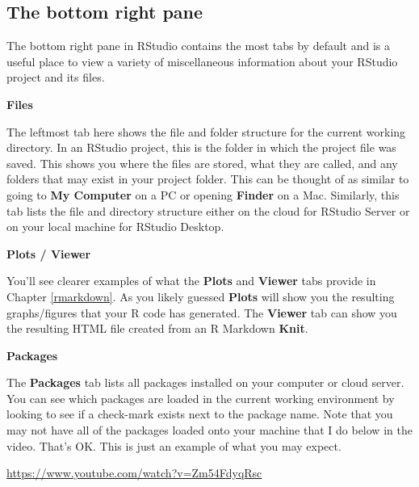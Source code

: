 \documentclass[]{tufte-book}
\begin{document}
\subsection{The bottom right pane}\label{the-bottom-right-pane}

The bottom right pane in RStudio contains the most tabs by default and is a useful place to view a variety of miscellaneous information about your RStudio project and its files.

\vspace*{0.2in}

\noindent\textbf{Files}\vspace*{0.1in}

The leftmost tab here shows the file and folder structure for the current working directory. In an RStudio project, this is the folder in which the project file was saved. This shows you where the files are stored, what they are called, and any folders that may exist in your project folder. This can be thought of as similar to going to \textbf{My Computer} on a PC or opening \textbf{Finder} on a Mac. Similarly, this tab lists the file and directory structure either on the cloud for RStudio Server or on your local machine for RStudio Desktop.

\vspace*{0.2in}

\noindent\textbf{Plots / Viewer}\vspace*{0.1in}

You'll see clearer examples of what the \textbf{Plots} and \textbf{Viewer} tabs provide in Chapter \ref{rmarkdown}. As you likely guessed \textbf{Plots} will show you the resulting graphs/figures that your R code has generated. The \textbf{Viewer} tab can show you the resulting HTML file created from an R Markdown \textbf{Knit}.

\vspace*{0.2in}

\noindent\textbf{Packages}\vspace*{0.1in}

The \textbf{Packages} tab lists all packages installed on your computer or cloud server. You can see which packages are loaded in the current working environment by looking to see if a check-mark exists next to the package name. Note that you may not have all of the packages loaded onto your machine that I do below in the video. That's OK. This is just an example of what you may expect.

\vspace{0.1in}\begin{center}\footnotesize{\url{https://www.youtube.com/watch?v=Zm54FdyqRsc}}\end{center}\vspace{0.1in}
\end{document}
